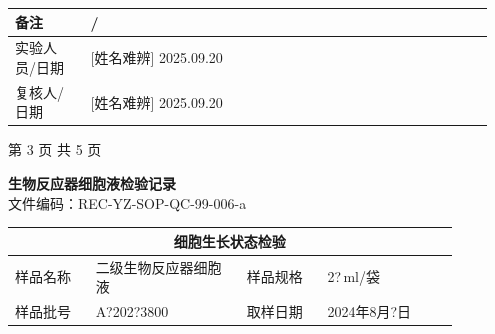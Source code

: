 \documentclass[UTF8,10pt,a4paper,fontset=fandol]{ctexart}
\newcommand{\fieldvalue}[1]{#1}
\newcommand{\handwritten}[1]{#1}
\begin{document}
\medskip
\noindent
\begin{tabular}{|p{0.15\linewidth}|p{0.80\linewidth}|}
\hline
备注 &
\fieldvalue{\handwritten{/}} \\ \hline
实验人员/日期 &
\fieldvalue{\handwritten{[姓名难辨]}}\quad
\fieldvalue{\handwritten{2025.09.20}} \\ \hline
复核人/日期 &
\fieldvalue{\handwritten{[姓名难辨]}}\quad
\fieldvalue{\handwritten{2025.09.20}} \\ \hline
\end{tabular}

\begin{center}
第 3 页 共 5 页
\end{center}

\newpage

\begin{center}
\textbf{生物反应器细胞液检验记录}\\
文件编码：REC-YZ-SOP-QC-99-006-a
\end{center}

\begin{center}
\begin{tabular}{|p{0.16\linewidth}|p{0.30\linewidth}|p{0.16\linewidth}|p{0.26\linewidth}|}
\hline
\multicolumn{4}{|c|}{细胞生长状态检验}\\
\hline
样品名称 &
\fieldvalue{\handwritten{二级生物反应器细胞液}} &
样品规格 &
\fieldvalue{\handwritten{2?}}\,ml/袋\\
\hline
样品批号 &
\fieldvalue{\handwritten{A?202?3800}} &
取样日期 &
\fieldvalue{\handwritten{2024年8月?日}}\\
\hline
\end{tabular}
\end{center}
\end{document}
